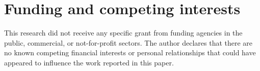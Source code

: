 \documentclass[10pt,twoside]{siamart1116}
\begin{document}
\section*{Funding and competing interests}
This research did not receive any specific grant from funding agencies in the
public, commercial, or not-for-profit sectors.  The author declares that
there are no known competing financial interests or personal relationships
that could have appeared to influence the work reported in this paper.


\end{document}
